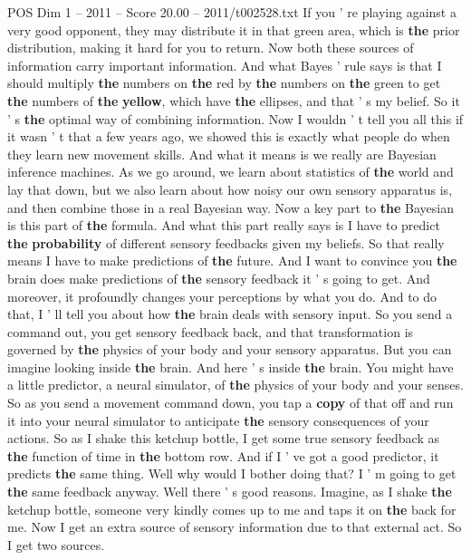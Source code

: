 \begin{textsample}{POS Dim 1 – 2011 – Score 20.00 – 2011/t002528.txt}
If you ' re playing against a very good opponent, they may distribute it in that green area, which is \textbf{the} prior distribution, making it hard for you to return.
Now both these sources of information carry important information.
And what Bayes ' rule says is that I should multiply \textbf{the} numbers on \textbf{the} red by \textbf{the} numbers on \textbf{the} green to get \textbf{the} numbers of \textbf{the} \textbf{yellow}, which have \textbf{the} ellipses, and that ' s my belief.
So it ' s \textbf{the} optimal way of combining information.
Now I wouldn ' t tell you all this if it wasn ' t that a few years ago, we showed this is exactly what people do when they learn new movement skills.
And what it means is we really are Bayesian inference machines.
As we go around, we learn about statistics of \textbf{the} world and lay that down, but we also learn about how noisy our own sensory apparatus is, and then combine those in a real Bayesian way.
Now a key part to \textbf{the} Bayesian is this part of \textbf{the} formula.
And what this part really says is I have to predict \textbf{the} \textbf{probability} of different sensory feedbacks given my beliefs.
So that really means I have to make predictions of \textbf{the} future.
And I want to convince you \textbf{the} brain does make predictions of \textbf{the} sensory feedback it ' s going to get.
And moreover, it profoundly changes your perceptions by what you do.
And to do that, I ' ll tell you about how \textbf{the} brain deals with sensory input.
So you send a command out, you get sensory feedback back, and that transformation is governed by \textbf{the} physics of your body and your sensory apparatus.
But you can imagine looking inside \textbf{the} brain.
And here ' s inside \textbf{the} brain.
You might have a little predictor, a neural simulator, of \textbf{the} physics of your body and your senses.
So as you send a movement command down, you tap a \textbf{copy} of that off and run it into your neural simulator to anticipate \textbf{the} sensory consequences of your actions.
So as I shake this ketchup bottle, I get some true sensory feedback as \textbf{the} function of time in \textbf{the} bottom row.
And if I ' ve got a good predictor, it predicts \textbf{the} same thing.
Well why would I bother doing that?
I ' m going to get \textbf{the} same feedback anyway.
Well there ' s good reasons.
Imagine, as I shake \textbf{the} ketchup bottle, someone very kindly comes up to me and taps it on \textbf{the} back for me.
Now I get an extra source of sensory information due to that external act.
So I get two sources.

\end{textsample}
